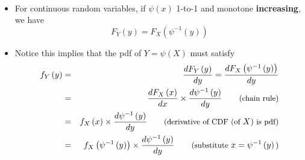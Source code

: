 \documentclass[smaller]{beamer}\usepackage[]{graphicx}\usepackage[]{color}
\newenvironment{stepitemize}{\begin{itemize}[<+->]}{\end{itemize} }
\begin{document}
\begin{frame}{\secname}
  \framesubtitle{\subsecname}

  \begin{stepitemize}
  \item For continuous random variables, if $\psi \left( x\right) $ 1-to-1 and
  monotone \textbf{increasing}, we have%
  \begin{equation*}
  F_{Y}\left( y\right) =F_{X}\left( \psi ^{-1}\left( y\right) \right)
  \end{equation*}

  \item Notice this implies that the pdf of $Y=\psi \left( X\right) $ must
  satisfy%
  \begin{eqnarray*}
  f_{Y}\left( y\right) &=&\frac{dF_{Y}\left( y\right) }{dy}=\frac{dF_{X}\left(
  \psi ^{-1}\left( y\right) \right) }{dy} \\
  &=&\frac{dF_{X}\left( x\right) }{dx}\times \frac{d\psi ^{-1}\left( y\right)
  }{dy}\qquad \text{{\small (chain rule)}} \\
  &=&f_{X}\left( x\right) \times \frac{d\psi ^{-1}\left( y\right) }{dy}\qquad
  \text{{\small (derivative of CDF (of }}X\text{){\small \ is pdf)}} \\
  &=&f_{X}\left( \psi ^{-1}\left( y\right) \right) \times \frac{d\psi
  ^{-1}\left( y\right) }{dy}\qquad \text{{\small (substitute }}x=\psi
  ^{-1}\left( y\right) \text{{\small )}}
  \end{eqnarray*}
  \end{stepitemize}

\end{frame}
\end{document}
